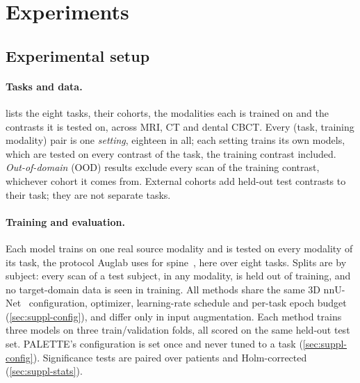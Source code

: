 \section{Experiments}
\label{sec:experiments}

\subsection{Experimental setup}
\label{subsec:e-setup}

\paragraph{Tasks and data.}  lists the eight tasks, their
cohorts, the modalities each is trained on and the contrasts it is tested on,
across MRI, CT and dental CBCT. Every (task, training modality) pair is one
\emph{setting}, eighteen in all; each setting trains its own models, which are
tested on every contrast of the task, the training contrast included.
\emph{Out-of-domain} (OOD) results exclude every scan of the training
contrast, whichever cohort it comes from. External cohorts add held-out test
contrasts to their task; they are not separate tasks.

\paragraph{Training and evaluation.} Each model trains on one real source
modality and is tested on every modality of its task, the protocol Auglab uses
for spine~\cite{molinier2026auglab}, here over eight tasks. Splits are by
subject: every scan of a test subject, in any modality, is held out of
training, and no target-domain data is seen in training. All methods share
the same 3D nnU-Net~\cite{isensee2021nnunet} configuration, optimizer,
learning-rate schedule and per-task epoch budget (\cref{sec:suppl-config}),
and differ only in input augmentation. Each method trains three models on
three train/validation folds, all scored on the same held-out test set.
PALETTE's configuration is set once and never tuned to a task
(\cref{sec:suppl-config}). Significance tests are paired over patients and
Holm-corrected~\cite{holm1979} (\cref{sec:suppl-stats}).

